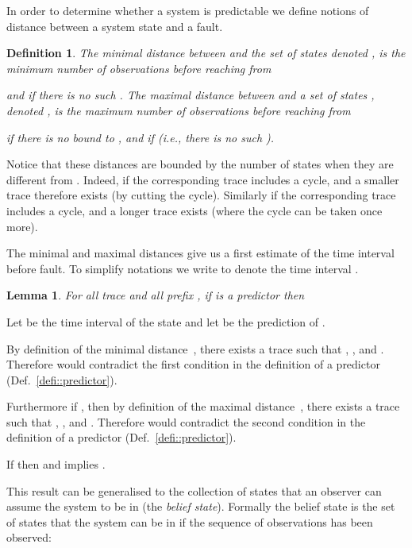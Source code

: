 \documentclass{article}
\newtheorem{defi}{Definition}
\newtheorem{lemm}{Lemma}
\newenvironment{proof}{\par\noindent{\bf Proof}}{\hspace{\stretch{1}}}
\begin{document}
In order to determine whether a system is predictable 
we define notions of distance between a system state and a fault.  

\begin{defi}
  The \emph{minimal distance} between  and the set  of states 
  denoted , is the minimum number of observations 
  before reaching  from  
  
  and  if there is no such .  
  The \emph{maximal distance} between  and a set of states , 
  denoted , is the maximum number of observations 
  before reaching  from  
  
   if there is no bound to , 
  and  if  (i.e., there is no such ).  
\end{defi}

Notice that these distances are bounded by the number  of states 
when they are different from .  
Indeed, if  
the corresponding trace includes a cycle, 
and a smaller trace therefore exists (by cutting the cycle).  
Similarly if  
the corresponding trace includes a cycle, 
and a longer trace exists (where the cycle can be taken once more).  


The minimal and maximal distances give us 
a first estimate of the time interval before fault.  
To simplify notations we write  
to denote the time interval .  

\begin{lemm}\label{lemm::singlestateprediction}
  For all trace  and all prefix , 
  if  is a predictor then
  
\end{lemm}

\begin{proof}
  Let  be the time interval 
  of the state  
  and let  be the prediction of .  

  By definition of the minimal distance~, 
  there exists a trace  
  such that , 
  , 
  and .  
  Therefore  would contradict the first condition 
  in the definition of a predictor (Def.~\ref{defi::predictor}).  

  Furthermore if , 
  then by definition of the maximal distance~, 
  there exists a trace  
  such that , 
  , 
  and .  
  Therefore  would contradict the second condition 
  in the definition of a predictor (Def.~\ref{defi::predictor}).  

  If  then  and  implies .  
\end{proof}

This result can be generalised to the collection of states 
that an observer can assume the system to be in 
(the \emph{belief state}).  
Formally the belief state  is the set of states 
that the system can be in if the sequence  of observations 
has been observed: 
\end{document}
